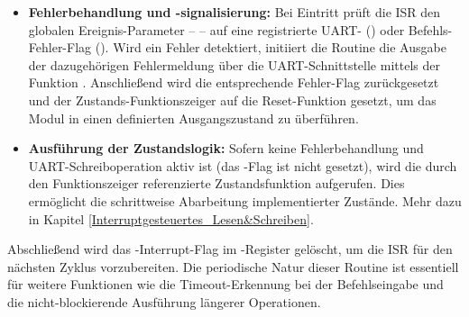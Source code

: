 \begin{itemize}
	\item \textbf{Fehlerbehandlung und -signalisierung:} Bei Eintritt pr\"uft die ISR den globalen Ereignis-Parameter --  -- auf eine registrierte UART- () oder Befehls-Fehler-Flag (). Wird ein Fehler detektiert, initiiert die Routine die Ausgabe der dazugeh\"origen Fehlermeldung \"uber die UART-Schnittstelle mittels der Funktion . Anschlie{\ss}end wird die entsprechende Fehler-Flag zur\"uckgesetzt und der Zustands-Funktionszeiger  auf die Reset-Funktion  gesetzt, um das Modul in einen definierten Ausgangszustand zu \"uberf\"uhren.

	\item \textbf{Ausf\"uhrung der Zustandslogik:} Sofern keine Fehlerbehandlung und UART-Schreiboperation aktiv ist (das -Flag ist nicht gesetzt), wird die durch den Funktionszeiger  referenzierte Zustandsfunktion aufgerufen. Dies erm\"oglicht die schrittweise Abarbeitung implementierter Zust\"ande. Mehr dazu in Kapitel \ref{Interruptgesteuertes_Lesen&Schreiben}.
\end{itemize}

Abschlie{\ss}end wird das -Interrupt-Flag im -Register gel\"oscht, um die ISR f\"ur den n\"achsten Zyklus vorzubereiten. Die periodische Natur dieser Routine ist essentiell f\"ur weitere Funktionen wie die Timeout-Erkennung bei der Befehlseingabe und die nicht-blockierende Ausf\"uhrung l\"angerer Operationen.

